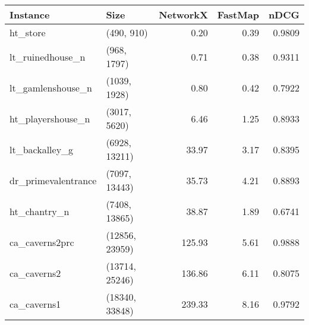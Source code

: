 \begin{tabular}{llrrr}
\toprule
           Instance &           Size &  NetworkX &  FastMap &   nDCG \\
\midrule
           ht\_store &     (490, 910) &      0.20 &     0.39 & 0.9809 \\
   lt\_ruinedhouse\_n &    (968, 1797) &      0.71 &     0.38 & 0.9311 \\
  lt\_gamlenshouse\_n &   (1039, 1928) &      0.80 &     0.42 & 0.7922 \\
  ht\_playershouse\_n &   (3017, 5620) &      6.46 &     1.25 & 0.8933 \\
     lt\_backalley\_g &  (6928, 13211) &     33.97 &     3.17 & 0.8395 \\
dr\_primevalentrance &  (7097, 13443) &     35.73 &     4.21 & 0.8893 \\
       ht\_chantry\_n &  (7408, 13865) &     38.87 &     1.89 & 0.6741 \\
     ca\_caverns2prc & (12856, 23959) &    125.93 &     5.61 & 0.9888 \\
        ca\_caverns2 & (13714, 25246) &    136.86 &     6.11 & 0.8075 \\
        ca\_caverns1 & (18340, 33848) &    239.33 &     8.16 & 0.9792 \\
\bottomrule
\end{tabular}
